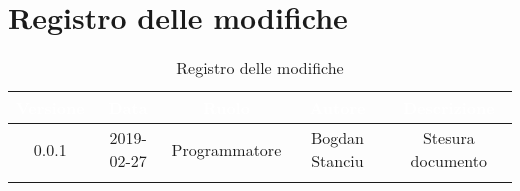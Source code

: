 \newpage

\section{Registro delle modifiche}

\begin{center}
\begin{longtable}{|c|c|c|c|c|}
\hline
\rowcolor{bluelogo}\textbf{\textcolor{white}{Versione}} & \textbf{\textcolor{white}{Data}} & \textbf{\textcolor{white}{Ruolo}} & \textbf{\textcolor{white}{Autore}} & \textbf{\textcolor{white}{Descrizione}}\\
\hline \hline
\endfirsthead
\rowcolor{grigio} 0.0.1 & 2019-02-27 & Programmatore & Bogdan Stanciu & Stesura documento \\
\hline
\caption{Registro delle modifiche}
\end{longtable}
\end{center}
